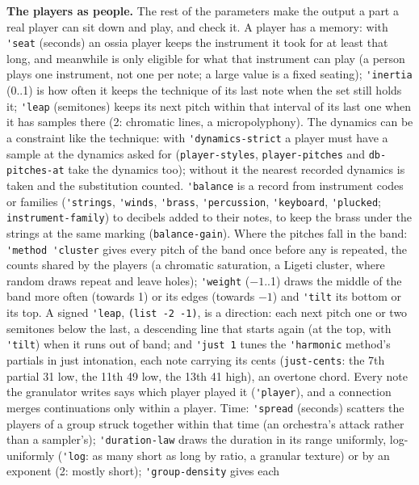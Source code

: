 \documentclass[11pt,a4paper]{article}
\newcommand{\musil}[1]{\lstinline[style=musilinline]{#1}}
\begin{document}
\textbf{The players as people.} The rest of the parameters make the output a part a real
player can sit down and play, and check it. A player has a memory: with \musil{'seat} (seconds)
an ossia player keeps the instrument it took for at least that long, and meanwhile is only
eligible for what that instrument can play (a person plays one instrument, not one per note; a
large value is a fixed seating); \musil{'inertia} (0..1) is how often it keeps the technique
of its last note when the set still holds it; \musil{'leap} (semitones) keeps its next pitch
within that interval of its last one when it has samples there (2: chromatic lines, a
micropolyphony). The dynamics can be a constraint like the technique: with
\musil{'dynamics-strict} a player must have a sample at the dynamics asked for
(\musil{player-styles}, \musil{player-pitches} and \musil{db-pitches-at} take the dynamics
too); without it the nearest recorded dynamics is taken and the substitution counted.
\musil{'balance} is a record from instrument codes or families (\musil{'strings},
\musil{'winds}, \musil{'brass}, \musil{'percussion}, \musil{'keyboard}, \musil{'plucked};
\musil{instrument-family}) to decibels added to their notes, to keep the brass under the
strings at the same marking (\musil{balance-gain}). Where the pitches fall in the band:
\musil{'method 'cluster} gives every pitch of the band once before any is repeated, the
counts shared by the players (a chromatic saturation, a Ligeti cluster, where random draws
repeat and leave holes); \musil{'weight} ($-1$..1) draws the middle of the band more often
(towards 1) or its edges (towards $-1$) and \musil{'tilt} its bottom or its top. A signed
\musil{'leap}, \musil{(list -2 -1)}, is a direction: each next pitch one or two semitones
below the last, a descending line that starts again (at the top, with \musil{'tilt}) when it
runs out of band; and \musil{'just 1} tunes the \musil{'harmonic} method's partials in just
intonation, each note carrying its cents (\musil{just-cents}: the 7th partial 31 low, the
11th 49 low, the 13th 41 high), an overtone chord. Every note the granulator writes says which
player played it (\musil{'player}), and a connection merges continuations only within a
player. Time:
\musil{'spread} (seconds) scatters the players of a group struck together within that time
(an orchestra's attack rather than a sampler's); \musil{'duration-law} draws the duration
in its range uniformly, log-uniformly (\musil{'log}: as many short as long by ratio, a
granular texture) or by an exponent (2: mostly short); \musil{'group-density} gives each
\end{document}

